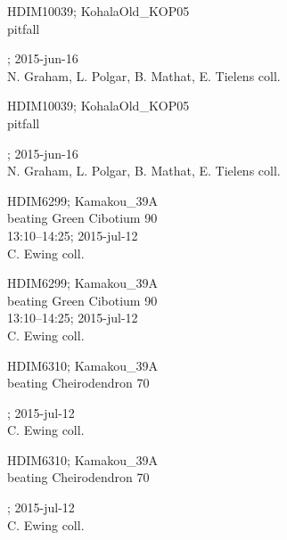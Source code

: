 \documentclass[2pt]{extarticle}
\begin{document}
\noindent
\raggedright
\parbox{0.17\textwidth}{\tiny HDIM10039; KohalaOld\_KOP05\\ pitfall  \\ \rule{0ex}{0ex}\hspace{4.5em}; 2015-jun-16\\ N. Graham, L. Polgar, B. Mathat, E. Tielens coll.}
\parbox{0.17\textwidth}{\tiny HDIM10039; KohalaOld\_KOP05\\ pitfall  \\ \rule{0ex}{0ex}\hspace{4.5em}; 2015-jun-16\\ N. Graham, L. Polgar, B. Mathat, E. Tielens coll.}
\parbox{0.17\textwidth}{\tiny HDIM6299; Kamakou\_39A\\ beating Green Cibotium 90\\ 13:10--14:25; 2015-jul-12\\ C. Ewing coll.}
\parbox{0.17\textwidth}{\tiny HDIM6299; Kamakou\_39A\\ beating Green Cibotium 90\\ 13:10--14:25; 2015-jul-12\\ C. Ewing coll.}
\parbox{0.17\textwidth}{\tiny HDIM6310; Kamakou\_39A\\ beating Cheirodendron 70\\ \rule{0ex}{0ex}\hspace{4.5em}; 2015-jul-12\\ C. Ewing coll.}
\parbox{0.17\textwidth}{\tiny HDIM6310; Kamakou\_39A\\ beating Cheirodendron 70\\ \rule{0ex}{0ex}\hspace{4.5em}; 2015-jul-12\\ C. Ewing coll.}
\end{document}
